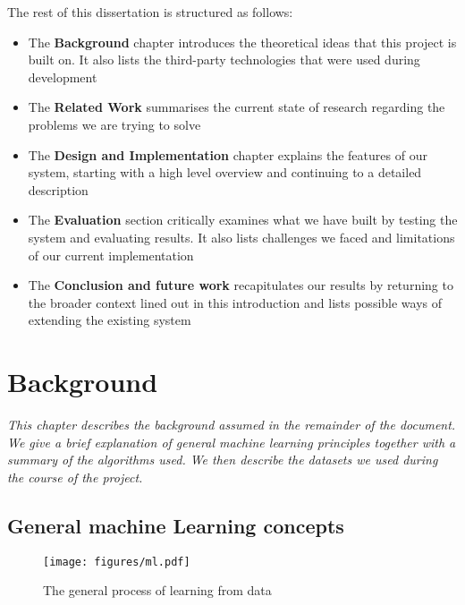 \documentclass[a4paper,12pt,twoside,openright]{report}
\begin{document}
The rest of this dissertation is structured as follows:
\begin{itemize}
	\item The \textbf{Background} chapter introduces the theoretical ideas that this project is built on. It also lists the third-party technologies that were used during development
	\item The \textbf{Related Work} summarises the current state of research regarding the problems we are trying to solve
	\item The \textbf{Design and Implementation} chapter explains the features of our system, starting with a high level overview and continuing to a detailed description
	\item The \textbf{Evaluation} section critically examines what we have built by testing the system and evaluating results. It also lists challenges we faced and limitations of our current implementation
	\item The \textbf{Conclusion and future work} recapitulates our results by returning to the broader context lined out in this introduction and lists possible ways of extending the existing system
\end{itemize}












\chapter{Background}
\textit{This chapter describes the background assumed in the remainder of the document. We give a brief explanation of general machine learning principles together with a summary of the algorithms used. We then describe the datasets we used during the course of the project.}





\section{General machine Learning concepts}
\begin{figure}
\centering
  \texttt{[image: figures/ml.pdf]}
  \caption{The general process of learning from data}
  \label{mlstructure}
\end{figure}
\end{document}
